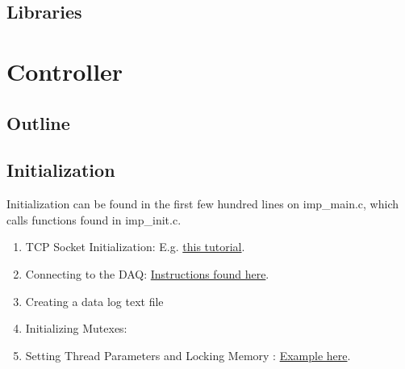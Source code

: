 \documentclass{article}
\begin{document}
	\subsection{Libraries}

\section{Controller}
	\subsection{Outline}
	
	
	\subsection{Initialization}
	Initialization can be found in the first few hundred lines on imp\_main.c, which calls functions found in imp\_init.c. 
	
	\begin{enumerate}
		\item TCP Socket Initialization: E.g. \href{https://www.geeksforgeeks.org/tcp-server-client-implementation-in-c/}{this tutorial}.
		\item Connecting to the DAQ: \href{https://labjack.com/support/software/api/ljm/function-reference/ljmopen}{Instructions found here}.
		\item Creating a data log text file 
		\item Initializing Mutexes: 
		\item Setting Thread Parameters and Locking Memory : \href{https://wiki.linuxfoundation.org/realtime/documentation/howto/applications/application_base}{Example here}.
	\end{enumerate}
	
\end{document}
